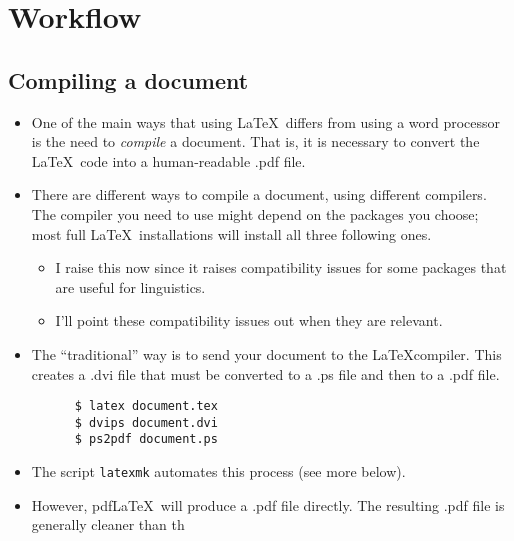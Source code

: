 \documentclass[11pt, letterpaper]{article}
\begin{document}
      
  \section{Workflow}
  
  \subsection{Compiling a document}
  
    \begin{itemize}
    
	\item One of the main ways that using \LaTeX\ differs from using a word processor is the need to \emph{compile} a document. That is, it is necessary to convert the \LaTeX\ code into a human-readable .pdf file.
    
      \item There are different ways to compile a document, using different compilers. The compiler you need to use might depend on the packages you choose; most full \LaTeX\ installations will install all three following ones.
      
	  \begin{itemize}
	  
	    \item I raise this now since it raises compatibility issues for some packages that are useful for linguistics. 
	    
	    \item I'll point these compatibility issues out when they are relevant.
	  
	  \end{itemize}
      
      \item The “traditional” way is to send your document to the \LaTeX compiler. This creates a .dvi file that must be converted to a .ps file and then to a .pdf file.
      
	\begin{verbatim}
	  $ latex document.tex
	  $ dvips document.dvi
	  $ ps2pdf document.ps
	\end{verbatim}
	
	\item The script \verb+latexmk+ automates this process (see more below).
	

      \item However, pdf\LaTeX\ will produce a .pdf file directly. The resulting .pdf file is generally cleaner than th
      

\end{itemize}
\end{document}
